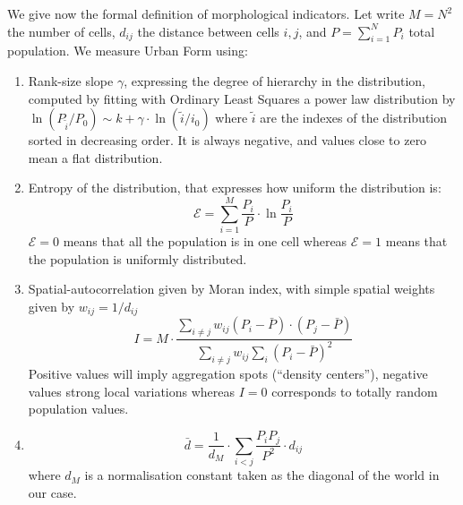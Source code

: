 \documentclass[10pt,letterpaper]{article}
\begin{document}

We give now the formal definition of morphological indicators. Let write $M=N^2$ the number of cells, $d_{ij}$ the distance between cells $i,j$, and $P=\sum_{i=1}^{N} P_i$ total population. We measure Urban Form using:

\begin{enumerate}
\item Rank-size slope $\gamma$, expressing the degree of hierarchy in the distribution, computed by fitting with Ordinary Least Squares a power law distribution by $\ln \left( P_{\tilde{i}}/P_0\right) \sim k + \gamma\cdot \ln \left(\tilde{i}/i_0\right)$ where $\tilde{i}$ are the indexes of the distribution sorted in decreasing order. It is always negative, and values close to zero mean a flat distribution.
\item Entropy of the distribution, that expresses how uniform the distribution is:
\begin{equation}
\mathcal{E} = \sum_{i=1}^{M}\frac{P_i}{P}\cdot \ln{\frac{P_i}{P}}
\end{equation}
$\mathcal{E}=0$ means that all the population is in one cell whereas $\mathcal{E}=1$ means that the population is uniformly distributed.
\item Spatial-autocorrelation given by Moran index, with simple spatial weights given by $w_{ij} = 1/d_{ij}$
\begin{equation}
I = M \cdot \frac{\sum_{i\neq j} w_{ij} \left(P_i - \bar{P}\right)\cdot\left(P_j - \bar{P}\right)}{\sum_{i\neq j} w_{ij} \sum_{i}{\left( P_i - \bar{P}\right)}^2}
\end{equation}
Positive values will imply aggregation spots (``density centers''), negative values strong local variations whereas $I=0$ corresponds to totally random population values.
\item {}
\begin{equation}
\bar{d} = \frac{1}{d_M}\cdot \sum_{i<j} \frac{P_i P_j}{P^2} \cdot d_{ij}
\end{equation}
where $d_M$ is a normalisation constant taken as the diagonal of the world in our case.
\end{enumerate}
\end{document}
